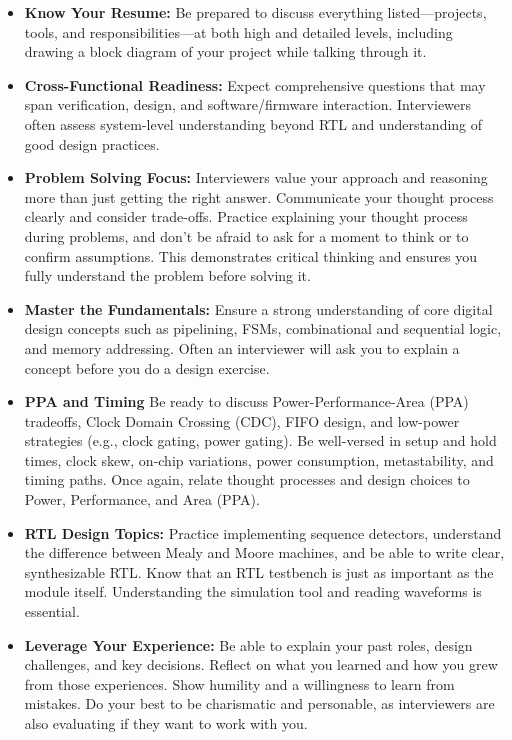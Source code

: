\begin{itemize}
    \item \textbf{Know Your Resume:} Be prepared to discuss everything
    listed—projects, tools, and responsibilities—at both high and detailed
    levels, including drawing a block diagram of your project while talking
    through it.

    \item \textbf{Cross-Functional Readiness:} Expect comprehensive questions
    that may span verification, design, and software/firmware interaction.
    Interviewers often assess system-level understanding beyond RTL and
    understanding of good design practices.

    \item \textbf{Problem Solving Focus:} Interviewers value your approach and
    reasoning more than just getting the right answer. Communicate your thought
    process clearly and consider trade-offs. Practice explaining your thought
    process during problems, and don't be afraid to ask for a moment to think
    or to confirm assumptions. This demonstrates critical thinking and ensures
    you fully understand the problem before solving it.

    \item \textbf{Master the Fundamentals:} Ensure a strong understanding of
    core digital design concepts such as pipelining, FSMs, combinational and
    sequential logic, and memory addressing. Often an interviewer will ask you
    to explain a concept before you do a design exercise.

    \item \textbf{PPA and Timing} Be ready to discuss Power-Performance-Area
    (PPA) tradeoffs, Clock Domain Crossing (CDC), FIFO design, and low-power
    strategies (e.g., clock gating, power gating). Be well-versed in setup and
    hold times, clock skew, on-chip variations, power consumption,
    metastability, and timing paths. Once again, relate thought processes and
    design choices to Power, Performance, and Area (PPA).

    \item \textbf{RTL Design Topics:} Practice implementing sequence detectors,
    understand the difference between Mealy and Moore machines, and be able to
    write clear, synthesizable RTL. Know that an RTL testbench is just as
    important as the module itself. Understanding the simulation tool and
    reading waveforms is essential.

    \item \textbf{Leverage Your Experience:} Be able to explain your past
    roles, design challenges, and key decisions. Reflect on what you learned
    and how you grew from those experiences. Show humility and a willingness to
    learn from mistakes. Do your best to be charismatic and personable, as
    interviewers are also evaluating if they want to work with you.
\end{itemize}



